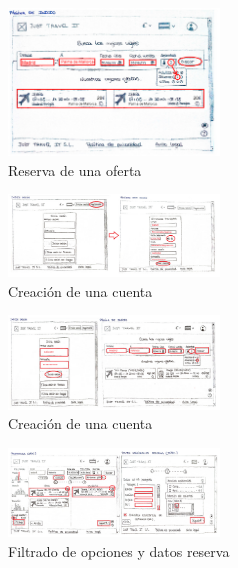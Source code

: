 \begin{figure}[H]
    \centering
    \includegraphics[width=0.5\textwidth]{Imagenes/Keypath/Marta7.png}
    \caption{Reserva de una oferta}
    \label{fig:Marta7}
\end{figure}

\begin{figure}[H]
    \centering
    \includegraphics[width=0.5\textwidth]{Imagenes/Keypath/Isabel1.png}
    \caption{Creación de una cuenta}
    \label{fig:Isabel1}
\end{figure}

\begin{figure}[H]
    \centering
    \includegraphics[width=0.5\textwidth]{Imagenes/Keypath/Isabel2.png}
    \caption{Creación de una cuenta}
    \label{fig:Isabel2}
\end{figure}

\begin{figure}[H]
    \centering
    \includegraphics[width=0.5\textwidth]{Imagenes/Keypath/Isabel3.png}
    \caption{Filtrado de opciones y datos reserva}
    \label{fig:Isabel3}
\end{figure}

